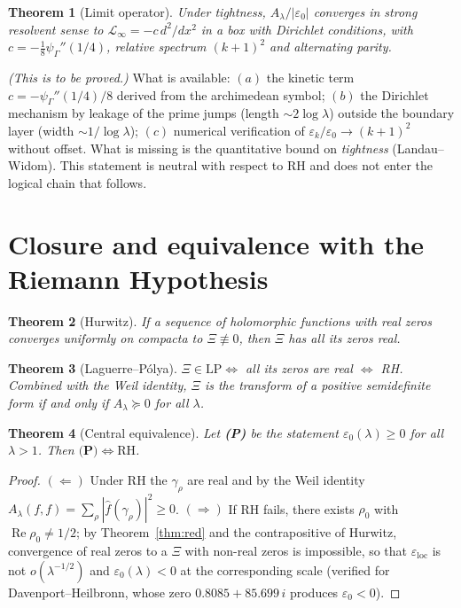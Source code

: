 \documentclass[11pt]{amsart}
\newtheorem{theorem}{Theorem}[section]
\theoremstyle{definition}
\theoremstyle{remark}
\newcommand{\ve}{\varepsilon}
\newcommand{\loc}{\mathrm{loc}}
\begin{document}
\begin{theorem}[Limit operator]
Under \emph{tightness}, $A_\lambda/|\ve_0|$ converges in strong resolvent sense to
$\mathcal L_\infty=-c\,d^2/dx^2$ in a box with Dirichlet conditions, with
$c=-\tfrac18\psi_\Gamma''(1/4)$, relative spectrum $(k+1)^2$ and alternating parity.
\end{theorem}
\noindent\emph{(This is to be proved.)} What is available: $(a)$ the kinetic term
$c=-\psi_\Gamma''(1/4)/8$ derived from the archimedean symbol; $(b)$ the Dirichlet mechanism
by leakage of the prime jumps (length $\sim2\log\lambda$) outside the boundary layer (width
$\sim1/\log\lambda$); $(c)$ numerical verification of $\ve_k/\ve_0\to(k+1)^2$ without offset.
What is missing is the quantitative bound on \emph{tightness} (Landau--Widom). This statement
is neutral with respect to RH and does not enter the logical chain that follows.

\section{Closure and equivalence with the Riemann Hypothesis}

\begin{theorem}[Hurwitz]\label{thm:hur}
If a sequence of holomorphic functions with real zeros converges uniformly on compacta to
$\Xi\not\equiv0$, then $\Xi$ has all its zeros real.
\end{theorem}

\begin{theorem}[Laguerre--Pólya]
$\Xi\in\mathrm{LP}\iff$ all its zeros are real $\iff$ RH. Combined with the Weil identity,
$\Xi$ is the transform of a positive semidefinite form if and only if $A_\lambda\succeq0$
for all $\lambda$.
\end{theorem}

\begin{theorem}[Central equivalence]\label{thm:equiv}
Let \textbf{(P)} be the statement $\ve_0(\lambda)\ge0$ for all $\lambda>1$. Then
$\textbf{(P)}\iff\mathrm{RH}$.
\end{theorem}
\begin{proof}
$(\Leftarrow)$ Under RH the $\gamma_\rho$ are real and by the Weil identity
$A_\lambda(f,f)=\sum_\rho|\hat f(\gamma_\rho)|^2\ge0$. $(\Rightarrow)$ If RH fails, there
exists $\rho_0$ with $\operatorname{Re}\rho_0\neq1/2$; by Theorem~\ref{thm:red} and the
contrapositive of Hurwitz, convergence of real zeros to a $\Xi$ with non-real zeros is
impossible, so that $\ve_\loc$ is not $o(\lambda^{-1/2})$ and $\ve_0(\lambda)<0$ at the
corresponding scale (verified for Davenport--Heilbronn, whose zero $0.8085+85.699\,i$ produces
$\ve_0<0$).
\end{proof}
\end{document}
